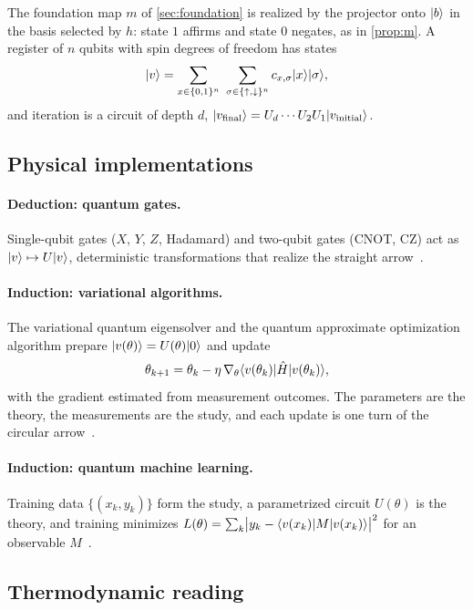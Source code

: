 The foundation map $m$ of \cref{sec:foundation} is realized by the projector onto $\lvert b\rangle$ in the
basis selected by $h$: state $1$ affirms and state $0$ negates, as in \cref{prop:m}. A register of
$n$ qubits with spin degrees of freedom has states
\[
  \ket v=\sum_{x\in\{0,1\}^n}\ \sum_{\sigma\in\{\up,\down\}^n} c_{x,\sigma}\ket x\ket\sigma ,
\]
and iteration is a circuit of depth $d$, $\lvert v_{\mathrm{final}}\rangle=U_d\cdots U_2U_1\lvert v_{\mathrm{initial}}\rangle$.

\subsection{Physical implementations}

\paragraph{Deduction: quantum gates.} Single-qubit gates ($X$, $Y$, $Z$, Hadamard) and two-qubit
gates (CNOT, CZ) act as $\lvert v\rangle\mapsto U\lvert v\rangle$, deterministic transformations that realize the
straight arrow~\cite{nielsen,deutsch}.

\paragraph{Induction: variational algorithms.} The variational quantum eigensolver and the quantum
approximate optimization algorithm prepare $\lvert v(\theta)\rangle=U(\theta)\lvert 0\rangle$ and update
\[
  \theta_{k+1}=\theta_k-\eta\,\nabla_\theta\langle v(\theta_k)\rvert\hat H\lvert v(\theta_k)\rangle,
\]
with the gradient estimated from measurement outcomes. The parameters are the theory, the
measurements are the study, and each update is one turn of the circular arrow~\cite{preskill}.

\paragraph{Induction: quantum machine learning.} Training data $\{(x_k,y_k)\}$ form the study, a
parametrized circuit $U(\theta)$ is the theory, and training minimizes
$L(\theta)=\sum_k\bigl|y_k-\langle v(x_k)\rvert M\lvert v(x_k)\rangle\bigr|^2$ for an observable
$M$~\cite{biamonte}.

\subsection{Thermodynamic reading}

